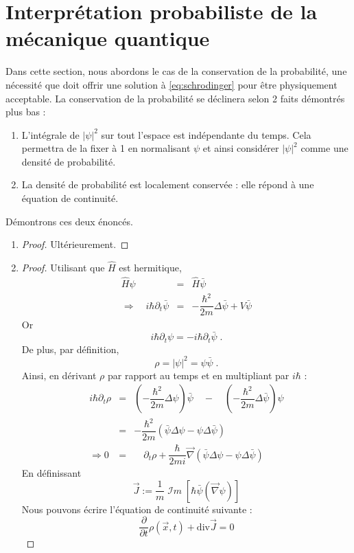 \documentclass[12pt, a4paper]{book}
\begin{document}
\section{Interprétation probabiliste de la mécanique quantique}
Dans cette section, nous abordons le cas de la conservation de la probabilité, une nécessité que doit offrir une solution à \eqref{eq:schrodinger} pour être physiquement acceptable. La conservation de la probabilité se déclinera selon 2 faits démontrés plus bas :
\begin{enumerate}[label= (\alph*)]
\item L'intégrale de $|\psi|^2$ sur tout l'espace est indépendante du temps. Cela permettra de la fixer à 1 en normalisant $\psi$ et ainsi considérer $|\psi|^2$ comme une densité de probabilité.
\item La densité de probabilité est localement conservée : elle répond à une équation de continuité. \\
\end{enumerate}
Démontrons ces deux énoncés.
\begin{enumerate}[label= (\alph*)]
\item \begin{proof}
Ultérieurement.
\end{proof}
\item \begin{proof}
Utilisant que $\hat{H}$ est hermitique,
\begin{eqnarray*}
\hat{H}\psi &=& \hat{H} \bar{\psi} \\
 \Rightarrow \quad i\hbar \partial_t \bar{\psi} &=& -\dfrac{\hbar^2}{2m} \Delta \bar{\psi}+ V \bar{\psi} 
\end{eqnarray*}
Or $$i\hbar \partial_t \psi = -i\hbar \partial_t \bar{\psi} \; .$$
De plus, par définition, 
$$\rho = |\psi|^2 = \psi \bar{\psi} \; .$$
Ainsi, en dérivant $\rho$ par rapport au temps et en multipliant par $i\hbar$ :
\begin{eqnarray*}
i\hbar \partial_t \rho &=& \left(-\dfrac{\hbar^2}{2m} \Delta \psi\right) \bar{\psi} \quad - \quad \left(-\dfrac{\hbar^2}{2m} \Delta \bar{\psi}\right)\psi \\
&=& -\dfrac{\hbar^2}{2m} \left( \bar{\psi} \Delta \psi - \psi \Delta \bar{\psi} \right) \\
\Rightarrow 0 &=& \quad \partial_t \rho + \dfrac{\hbar}{2mi} \vec \nabla \left( \bar{\psi} \Delta \psi - \psi \Delta \bar{\psi} \right) 
\end{eqnarray*}
En définissant 
\begin{equation} \label{eq:courant_proba}
\vec J := \dfrac{1}{m} \; \mathcal{I}m \;\left[\hbar \bar{\psi}(\vec \nabla \psi)\right] 
\end{equation} 
Nous pouvons écrire l'équation de continuité suivante :
\begin{equation} \label{eq:continuite_proba}
\boxed{\dfrac{\partial}{\partial t} \rho(\vec x, t) + \mathrm{div} \vec J = 0}
\end{equation}
\end{proof}\end{enumerate}
\end{document}

